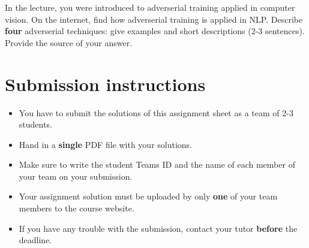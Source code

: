 \begin{solution}
   
   
\end{solution}


\begin{exercise}

In the lecture, you were introduced to adverserial training applied in computer vision.
On the internet, find how adverserial training is applied in NLP.
Describe \textbf{four} adverserial techniques: give examples and short descriptions (2-3 sentences). Provide the source of your answer.

\end{exercise}

\begin{solution}

  
\end{solution}

\section*{Submission instructions}


\begin{itemize}
    \item You have to submit the solutions of this assignment sheet as a team of 2-3 students.
    \item  Hand in a \textbf{single} PDF file with your solutions.
    \item Make sure to write the student Teams ID and the name of each
    member of your team on your submission.
    \item Your assignment solution must be uploaded by only \textbf{one} of your team members to the course website.
    \item If you have any trouble with the submission, contact your tutor \textbf{before} the deadline.
\end{itemize}


